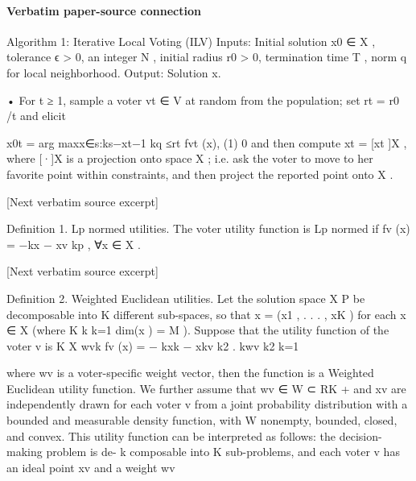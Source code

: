\documentclass[10pt]{article}
\begin{document}
\paragraph{Verbatim paper-source connection}
\begin{ReviewVerbatim}
Algorithm 1: Iterative Local Voting (ILV)
  Inputs: Initial solution x0 ∈ X , tolerance ϵ > 0, an integer N , initial radius r0 > 0,
    termination time T , norm q for local neighborhood.
   Output:     Solution x.

       • For t ≥ 1, sample a voter vt ∈ V at random from the population; set rt = r0 /t
           and elicit


                             x0t = arg maxx∈{s:ks−xt−1 kq ≤rt } fvt (x),             (1)
                                         0
           and then compute xt = [xt ]X , where [·]X is a projection onto space X ; i.e. ask
           the voter to move to her favorite point within constraints, and then project the
           reported point onto X .

[Next verbatim source excerpt]

Definition 1. Lp normed utilities. The voter utility function is Lp normed if fv (x) =
−kx − xv kp , ∀x ∈ X .

[Next verbatim source excerpt]

Definition 2. Weighted Euclidean utilities. Let the solution space X P           be decomposable
into K different sub-spaces, so that x = (x1 , . . . , xK ) for each x ∈ X (where K         k
                                                                                  k=1 dim(x ) =
M ). Suppose that the utility function of the voter v is
                                         K
                                         X  wvk
                              fv (x) = −          kxk − xkv k2 .
                                           kwv k2
                                         k=1

where wv is a voter-specific weight vector, then the function is a Weighted Euclidean utility
function. We further assume that wv ∈ W ⊂ RK      + and xv are independently drawn for each
voter v from a joint probability distribution with a bounded and measurable density function,
with W nonempty, bounded, closed, and convex.
   This utility function can be interpreted as follows: the decision-making problem is de-
                                                                           k
composable into K sub-problems, and each voter v has an ideal point xv and a weight wv


\end{ReviewVerbatim}
\end{document}
